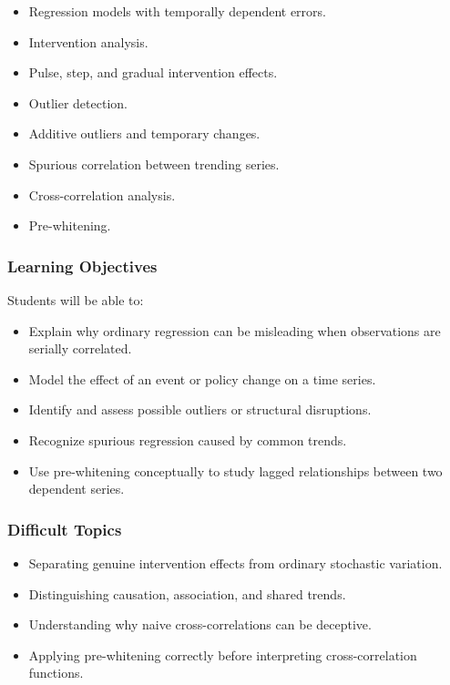 \documentclass[11pt]{article}
\begin{document}
\begin{itemize}
    \item Regression models with temporally dependent errors.
    \item Intervention analysis.
    \item Pulse, step, and gradual intervention effects.
    \item Outlier detection.
    \item Additive outliers and temporary changes.
    \item Spurious correlation between trending series.
    \item Cross-correlation analysis.
    \item Pre-whitening.
\end{itemize}

\subsubsection{Learning Objectives}

Students will be able to:

\begin{itemize}
    \item Explain why ordinary regression can be misleading when observations
    are serially correlated.
    \item Model the effect of an event or policy change on a time series.
    \item Identify and assess possible outliers or structural disruptions.
    \item Recognize spurious regression caused by common trends.
    \item Use pre-whitening conceptually to study lagged relationships between
    two dependent series.
\end{itemize}

\subsubsection{Difficult Topics}

\begin{itemize}
    \item Separating genuine intervention effects from ordinary stochastic
    variation.
    \item Distinguishing causation, association, and shared trends.
    \item Understanding why naive cross-correlations can be deceptive.
    \item Applying pre-whitening correctly before interpreting cross-correlation
    functions.
\end{itemize}
\end{document}
